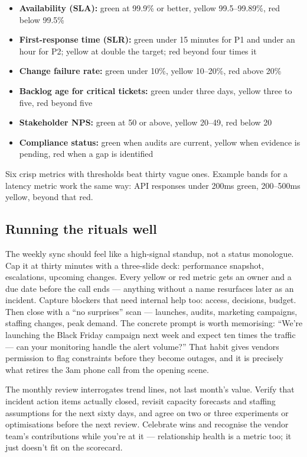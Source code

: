 \begin{itemize}[leftmargin=*]
\item \textbf{Availability (SLA):} green at 99.9\% or better, yellow 99.5–99.89\%, red below 99.5\%
\item \textbf{First-response time (SLR):} green under 15 minutes for P1 and under an hour for P2; yellow at double the target; red beyond four times it
\item \textbf{Change failure rate:} green under 10\%, yellow 10–20\%, red above 20\%
\item \textbf{Backlog age for critical tickets:} green under three days, yellow three to five, red beyond five
\item \textbf{Stakeholder NPS:} green at 50 or above, yellow 20–49, red below 20
\item \textbf{Compliance status:} green when audits are current, yellow when evidence is pending, red when a gap is identified
\end{itemize}

Six crisp metrics with thresholds beat thirty vague ones. Example bands for a latency metric work the same way: API responses under 200ms green, 200–500ms yellow, beyond that red.



\subsection{Running the rituals well}


The weekly sync should feel like a high-signal standup, not a status monologue. Cap it at thirty minutes with a three-slide deck: performance snapshot, escalations, upcoming changes. Every yellow or red metric gets an owner and a due date before the call ends — anything without a name resurfaces later as an incident. Capture blockers that need internal help too: access, decisions, budget. Then close with a ``no surprises'' scan — launches, audits, marketing campaigns, staffing changes, peak demand. The concrete prompt is worth memorising: ``We're launching the Black Friday campaign next week and expect ten times the traffic — can your monitoring handle the alert volume?'' That habit gives vendors permission to flag constraints before they become outages, and it is precisely what retires the 3am phone call from the opening scene.


The monthly review interrogates trend lines, not last month's value. Verify that incident action items actually closed, revisit capacity forecasts and staffing assumptions for the next sixty days, and agree on two or three experiments or optimisations before the next review. Celebrate wins and recognise the vendor team's contributions while you're at it — relationship health is a metric too; it just doesn't fit on the scorecard.



